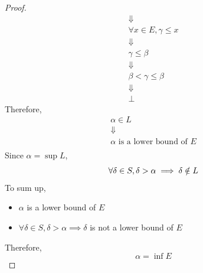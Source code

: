 \begin{proof}
\[\begin{array}{c}
        \Downarrow \\
        \forall x \in E, \gamma \leq x \\
        \Downarrow \\
        \gamma \leq \beta \\
        \Downarrow \\
        \beta < \gamma \leq \beta \\
        \Downarrow \\
        \bot
    \end{array}
    \]
    Therefore,
    \[
    \begin{array}{c}
        \alpha \in L \\
        \Downarrow \\
        \alpha \text{ is a lower bound of } E \\
    \end{array}
    \]
    Since $\alpha = \sup L$,
    \[
    \forall \delta \in S, \delta > \alpha \implies \delta \notin L \\
    \]
    To sum up,
    \begin{itemize}
        \item $\alpha$ is a lower bound of $E$
        \item $\forall \delta \in S, \delta > \alpha \implies \delta$ is not a lower bound of $E$
    \end{itemize}
    Therefore,
    \[
    \alpha = \inf E
    \]
\end{proof}


